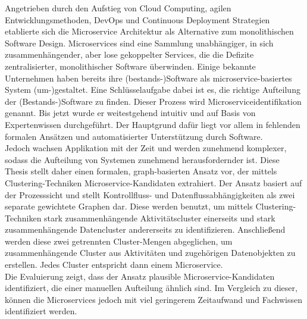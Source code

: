 
\Abstract
Angetrieben durch den Aufstieg von Cloud Computing, agilen Entwicklungsmethoden, DevOps und Continuous Deployment Strategien etablierte sich die Microservice Architektur als Alternative zum monolithischen Software Design. Microservices sind eine Sammlung unabhängiger, in sich zusammenhängender, aber lose gekoppelter Services, die die Defizite zentralisierter, monolithischer Software überwinden. Einige bekannte Unternehmen haben bereits ihre (bestands-)Software als microservice-basiertes System (um-)gestaltet.
Eine Schlüsselaufgabe dabei ist es, die richtige Aufteilung der (Bestands-)Software zu finden. Dieser Prozess wird Microserviceidentifikation genannt. Bis jetzt wurde er weitestgehend intuitiv und auf Basis von Expertenwissen durchgeführt. Der Hauptgrund dafür liegt vor allem in fehlenden formalen Ansätzen und automatisierter Unterstützung durch Software.\\
Jedoch wachsen Applikation mit der Zeit und werden zunehmend komplexer, sodass die Aufteilung von Systemen zunehmend herausfordernder ist. Diese Thesis stellt daher einen formalen, graph-basierten Ansatz vor, der mittels Clustering-Techniken Microservice-Kandidaten extrahiert. Der Ansatz basiert auf der Prozesssicht und stellt Kontrollfluss- und Datenflussabhängigkeiten als zwei separate gewichtete Graphen dar. Diese werden benutzt, um mittels Clustering-Techniken stark zusammenhängende Aktivitätscluster einerseits und stark zusammenhängende Datencluster andererseits zu identifizieren. Anschließend werden diese zwei getrennten Cluster-Mengen abgeglichen, um zusammenhängende Cluster aus Aktivitäten und zugehörigen Datenobjekten zu erstellen. Jedes Cluster entspricht dann einem Microservice. \\
Die Evaluierung zeigt, dass der Ansatz plausible Microservice-Kandidaten identifiziert, die einer manuellen Aufteilung ähnlich sind. Im Vergleich zu dieser, können die Microservices jedoch mit viel geringerem Zeitaufwand und Fachwissen identifiziert werden.

